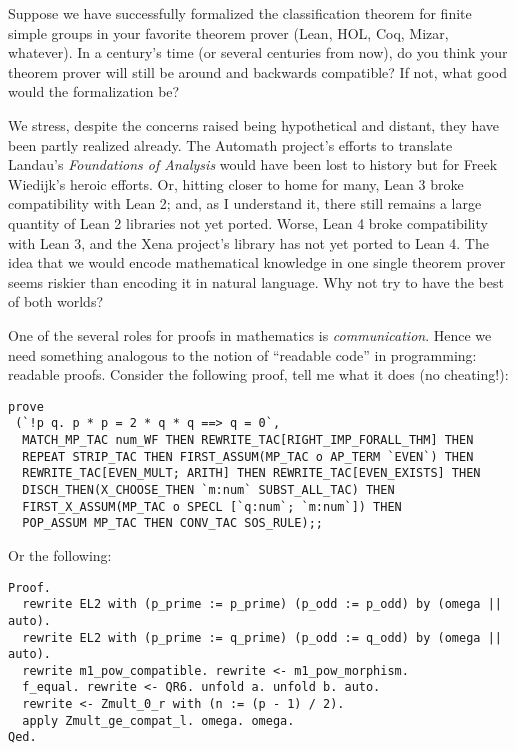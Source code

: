 \M
Suppose we have successfully formalized the classification theorem for
finite simple groups in your favorite theorem prover (Lean, HOL, Coq,
Mizar, whatever). In a century's time (or several centuries from now),
do you think your theorem prover will still be around and backwards
compatible? If not, what good would the formalization be?

\begin{remark}
We stress, despite the concerns raised being hypothetical and distant,
they have been partly realized already. The Automath project's
efforts to translate Landau's \emph{Foundations of Analysis} would have
been lost to history but for Freek Wiedijk's heroic efforts. Or, hitting
closer to home for many, Lean 3 broke compatibility with Lean 2; and, as
I understand it, there still remains a large quantity of Lean 2
libraries not yet ported. Worse, Lean 4 broke compatibility with Lean 3,
and the Xena project's library has not yet ported to Lean 4. The idea
that we would encode mathematical knowledge in one single theorem prover
seems riskier than encoding it in natural language. Why not try to have
the best of both worlds?
\end{remark}

One of the several roles for proofs in mathematics is
\emph{communication}. Hence we need something analogous to the notion of
``readable code'' in programming: readable proofs. Consider the
following proof, tell me what it does (no cheating!):

\begin{Verbatim}
prove
 (`!p q. p * p = 2 * q * q ==> q = 0`,
  MATCH_MP_TAC num_WF THEN REWRITE_TAC[RIGHT_IMP_FORALL_THM] THEN
  REPEAT STRIP_TAC THEN FIRST_ASSUM(MP_TAC o AP_TERM `EVEN`) THEN
  REWRITE_TAC[EVEN_MULT; ARITH] THEN REWRITE_TAC[EVEN_EXISTS] THEN
  DISCH_THEN(X_CHOOSE_THEN `m:num` SUBST_ALL_TAC) THEN
  FIRST_X_ASSUM(MP_TAC o SPECL [`q:num`; `m:num`]) THEN
  POP_ASSUM MP_TAC THEN CONV_TAC SOS_RULE);;
\end{Verbatim}

Or the following:

\begin{Verbatim}
Proof.
  rewrite EL2 with (p_prime := p_prime) (p_odd := p_odd) by (omega || auto).
  rewrite EL2 with (p_prime := q_prime) (p_odd := q_odd) by (omega || auto).
  rewrite m1_pow_compatible. rewrite <- m1_pow_morphism.
  f_equal. rewrite <- QR6. unfold a. unfold b. auto.
  rewrite <- Zmult_0_r with (n := (p - 1) / 2).
  apply Zmult_ge_compat_l. omega. omega.
Qed.
\end{Verbatim}

